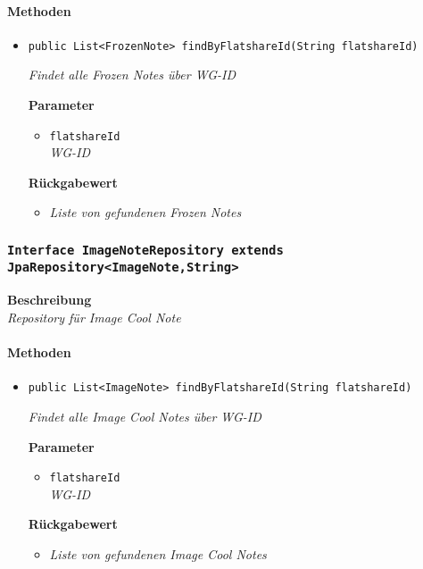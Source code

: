      \paragraph*{Methoden}
     \begin{itemize}
     	\item{\texttt{public List<FrozenNote> findByFlatshareId(String flatshareId)}}
     	
     	\textit{Findet alle Frozen Notes über WG-ID}
     	
     	\textbf{Parameter}
     	\begin{itemize}
     		\item\texttt{flatshareId}\\
     		\textit{WG-ID}
     	\end{itemize}
     	
     	\textbf{Rückgabewert}
     	\begin{itemize}
     		\item\textit{Liste von gefundenen Frozen Notes}
     	\end{itemize}
     \end{itemize}
 
     \subsubsection{\texttt{Interface ImageNoteRepository extends JpaRepository<ImageNote,String>}}
     \textbf{Beschreibung} \\
     \textit{Repository für Image Cool Note}
     \paragraph*{Methoden}
     \begin{itemize}
     	\item{\texttt{public List<ImageNote> findByFlatshareId(String flatshareId)}}
     	
     	\textit{Findet alle Image Cool Notes über WG-ID}
     	
     	\textbf{Parameter} 
     	\begin{itemize}
     		\item\texttt{flatshareId}\\
     		\textit{WG-ID}
     	\end{itemize}
     	
     	\textbf{Rückgabewert}
     	\begin{itemize}
     		\item\textit{Liste von gefundenen Image Cool Notes}
     	\end{itemize}
     \end{itemize}
 
